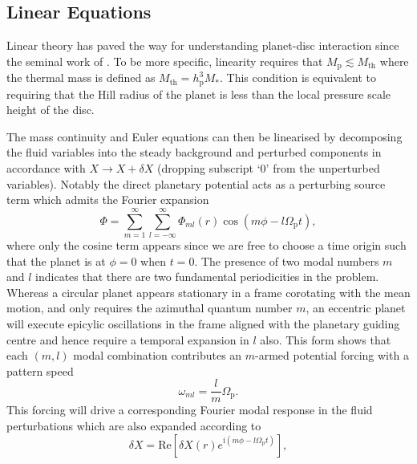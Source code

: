 \subsection{Linear Equations}
\label{subsection:linear_equations}

Linear theory has paved the way for understanding planet-disc interaction since the seminal work of \cite{GoldreichTremaine_1979, GoldreichTremaine_1980}. To be more specific, linearity requires that $M_\textrm{p} \lesssim M_\textrm{th}$ where the thermal mass is defined as $M_\textrm{th} = h_\textrm{p}^3 M_*$. This condition is equivalent to requiring that the Hill radius of the planet is less than the local pressure scale height of the disc.

The mass continuity and Euler equations can then be linearised by decomposing the fluid variables into the steady background and perturbed components in accordance with $X\rightarrow X+\delta X$ (dropping subscript `$0$' from the unperturbed variables). Notably the direct planetary potential acts as a perturbing source term which admits the Fourier expansion
%
\begin{equation}
    \label{eqn:potential_expansion}
    \Phi = \sum_{m = 1}^{\infty} \sum_{l = -\infty}^{\infty} \Phi_{ml}(r)\cos\left(m\phi-l \Omega_\textrm{p} t\right) ,
\end{equation}
%
where only the cosine term appears since we are free to choose a time origin such that the planet is at $\phi = 0$ when $t=0$. The presence of two modal numbers $m$ and $l$ indicates that there are two fundamental periodicities in the problem. Whereas a circular planet appears stationary in a frame corotating with the mean motion, and only requires the azimuthal quantum number $m$, an eccentric planet will execute epicylic oscillations in the frame aligned with the planetary guiding centre and hence require a temporal expansion in $l$ also. This form shows that each $(m,l)$ modal combination contributes an $m$-armed potential forcing with a pattern speed
%
\begin{equation}
    \label{eqn:pattern_speed}
    \omega_{ml} = \frac{l}{m}\Omega_\textrm{p}.
\end{equation}
%
This forcing will drive a corresponding Fourier modal response in the fluid perturbations which are also expanded according to 
%
\begin{equation}
    \label{eqn:modal_repsonse}
    \delta X = \mathrm{Re}\left[\delta X(r)e^{\mathrm{i}(m\phi-l\Omega_\textrm{p}t)} \right],
\end{equation}
